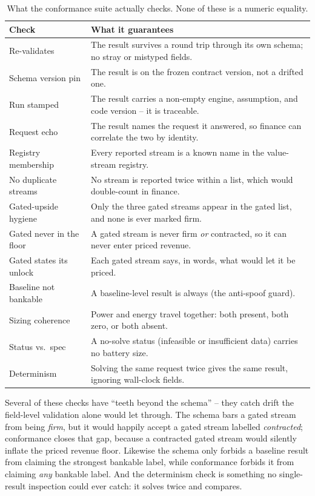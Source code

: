\begin{table}[H]
\centering
\caption{What the conformance suite actually checks. None of these is a numeric equality.}
\label{tab:conformance}
\small\sffamily
\begin{tabularx}{\textwidth}{@{}l L@{}}
\toprule
\textbf{Check} & \textbf{What it guarantees} \\
\midrule
Re-validates & The result survives a round trip through its own schema; no stray or mistyped fields. \\
Schema version pin & The result is on the frozen contract version, not a drifted one. \\
Run stamped & The result carries a non-empty engine, assumption, and code version -- it is traceable. \\
Request echo & The result names the request it answered, so finance can correlate the two by identity. \\
Registry membership & Every reported stream is a known name in the value-stream registry. \\
No duplicate streams & No stream is reported twice within a list, which would double-count in finance. \\
Gated-upside hygiene & Only the three gated streams appear in the gated list, and none is ever marked firm. \\
Gated never in the floor & A gated stream is never firm \emph{or} contracted, so it can never enter priced revenue. \\
Gated states its unlock & Each gated stream says, in words, what would let it be priced. \\
Baseline not bankable & A baseline-level result is always  (the anti-spoof guard). \\
Sizing coherence & Power and energy travel together: both present, both zero, or both absent. \\
Status vs.\ spec & A no-solve status (infeasible or insufficient data) carries no battery size. \\
Determinism & Solving the same request twice gives the same result, ignoring wall-clock fields. \\
\bottomrule
\end{tabularx}
\end{table}

Several of these checks have ``teeth beyond the schema'' -- they catch drift the field-level validation alone would let through. The schema bars a gated stream from being \emph{firm}, but it would happily accept a gated stream labelled \emph{contracted}; conformance closes that gap, because a contracted gated stream would silently inflate the priced revenue floor. Likewise the schema only forbids a baseline result from claiming the strongest bankable label, while conformance forbids it from claiming \emph{any} bankable label. And the determinism check is something no single-result inspection could ever catch: it solves twice and compares.

